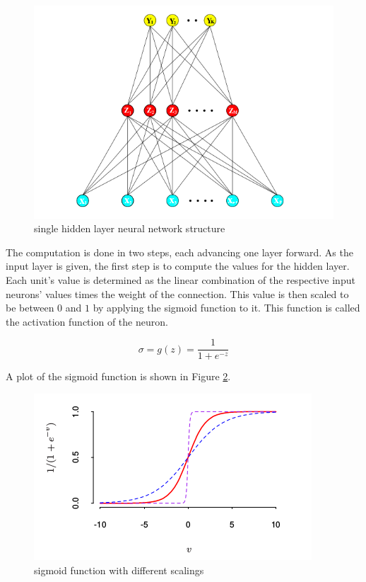 \begin{figure}[H]
\centering
\includegraphics[width=0.8\linewidth]{include/images/nn_structure.png}
\caption{single hidden layer neural network structure\cite{hastie2009elements}}
\label{fig:nn_structure}
\end{figure}

The computation is done in two steps, each advancing one layer forward. As the input layer is given, the first step is to compute the values for the hidden layer. Each unit's value is determined as the linear combination of the respective input neurons' values times the weight of the connection. This value is then scaled to be between $0$ and $1$ by applying the sigmoid function to it. This function is called the activation function of the neuron.

\begin{equation}
    \sigma = g(z) = \frac{1}{1+e^{-z}}
\end{equation}

A plot of the sigmoid function is shown in Figure \ref{fig:plot_sigmoid}.

\begin{figure}[H]
\centering
\includegraphics[width=0.8\linewidth]{include/images/plot_sigmoid.png}
\caption{sigmoid function with different scalings}
\label{fig:plot_sigmoid}
\end{figure}

